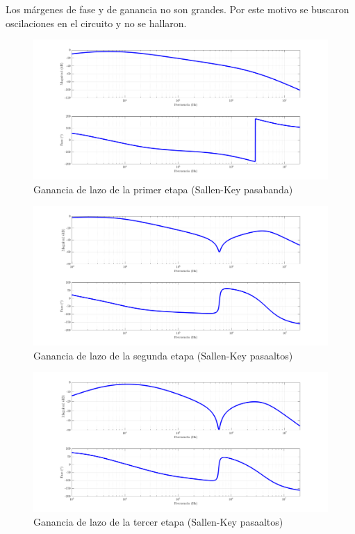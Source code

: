 Los m\'argenes de fase y de ganancia no son grandes. Por este motivo se buscaron oscilaciones en el circuito y no se hallaron.

\begin{figure}[H]
	\centering
	\includegraphics[width = \textwidth]{imagenes/estabilidad_etapa_1_v1}
	\caption{Ganancia de lazo de la primer etapa (Sallen-Key pasabanda)}
	\label{fig:loop_gain_1}
\end{figure}
\begin{figure}[H]
	\centering
	\includegraphics[width = \textwidth]{imagenes/estabilidad_etapa_2_v1}
	\caption{Ganancia de lazo de la segunda etapa (Sallen-Key pasaaltos)}
	\label{fig:loop_gain_2}
\end{figure}
\begin{figure}[H]
	\centering
	\includegraphics[width = \textwidth]{imagenes/estabilidad_etapa_3_v1}
	\caption{Ganancia de lazo de la tercer etapa (Sallen-Key pasaaltos)}
	\label{fig:loop_gain_3}
\end{figure}
